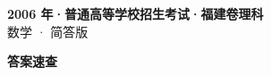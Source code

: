 \documentclass[zihao=-4, a4paper]{ctexart}
\begin{document}
\begin{center}
  {\Large\bfseries 2006 年·普通高等学校招生考试·福建卷理科}\\[4pt]
  {\large 数学 · 简答版}
\end{center}
\medskip
{}

\clearpage
{}
\begin{center}{\Large\bfseries 答案速查}\end{center}
\medskip

\end{document}
